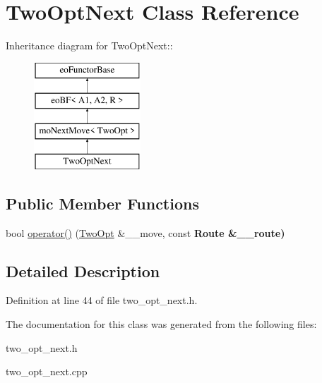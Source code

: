 \hypertarget{classTwoOptNext}{
\section{Two\-Opt\-Next Class Reference}
\label{classTwoOptNext}
}
Inheritance diagram for Two\-Opt\-Next::\begin{figure}[H]
\begin{center}
\leavevmode
\includegraphics[height=4cm]{classTwoOptNext}
\end{center}
\end{figure}
\subsection*{Public Member Functions}
\begin{CompactItemize}
\item 
\hypertarget{classTwoOptNext_baf229b2e056f39ab971cf2ac66a833e}{
bool \hyperlink{classTwoOptNext_baf229b2e056f39ab971cf2ac66a833e}{operator()} (\hyperlink{classTwoOpt}{Two\-Opt} \&\_\-\_\-move, const \bf{Route} \&\_\-\_\-route)}
\label{classTwoOptNext_baf229b2e056f39ab971cf2ac66a833e}

\end{CompactItemize}


\subsection{Detailed Description}




Definition at line 44 of file two\_\-opt\_\-next.h.

The documentation for this class was generated from the following files:\begin{CompactItemize}
\item 
two\_\-opt\_\-next.h\item 
two\_\-opt\_\-next.cpp\end{CompactItemize}
